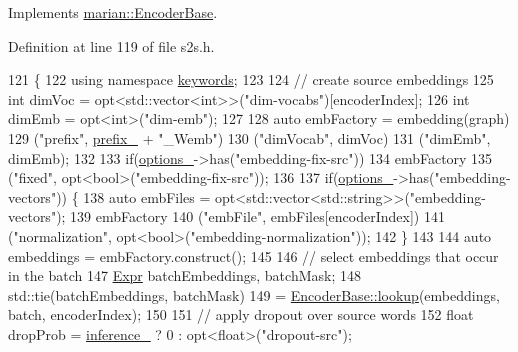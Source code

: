 Implements \hyperlink{classmarian_1_1EncoderBase_a7404d245bf899d6d8023d56407d81272}{marian\+::\+Encoder\+Base}.



Definition at line 119 of file s2s.\+h.


\begin{DoxyCode}
121                                                \{
122     \textcolor{keyword}{using namespace }\hyperlink{namespacekeywords}{keywords};
123 
124     \textcolor{comment}{// create source embeddings}
125     \textcolor{keywordtype}{int} dimVoc = opt<std::vector<int>>(\textcolor{stringliteral}{"dim-vocabs"})[encoderIndex];
126     \textcolor{keywordtype}{int} dimEmb = opt<int>(\textcolor{stringliteral}{"dim-emb"});
127 
128     \textcolor{keyword}{auto} embFactory = embedding(graph)
129                       (\textcolor{stringliteral}{"prefix"}, \hyperlink{classmarian_1_1EncoderBase_abbd764c19ebaae1d6e4ffec0c9930fba}{prefix\_} + \textcolor{stringliteral}{"\_Wemb"})
130                       (\textcolor{stringliteral}{"dimVocab"}, dimVoc)
131                       (\textcolor{stringliteral}{"dimEmb"}, dimEmb);
132 
133     \textcolor{keywordflow}{if}(\hyperlink{classmarian_1_1EncoderBase_a42fa90e65cd49dacccae154bf7873d97}{options\_}->has(\textcolor{stringliteral}{"embedding-fix-src"}))
134       embFactory
135         (\textcolor{stringliteral}{"fixed"}, opt<bool>(\textcolor{stringliteral}{"embedding-fix-src"}));
136 
137     \textcolor{keywordflow}{if}(\hyperlink{classmarian_1_1EncoderBase_a42fa90e65cd49dacccae154bf7873d97}{options\_}->has(\textcolor{stringliteral}{"embedding-vectors"})) \{
138       \textcolor{keyword}{auto} embFiles = opt<std::vector<std::string>>(\textcolor{stringliteral}{"embedding-vectors"});
139       embFactory
140         (\textcolor{stringliteral}{"embFile"}, embFiles[encoderIndex])
141         (\textcolor{stringliteral}{"normalization"}, opt<bool>(\textcolor{stringliteral}{"embedding-normalization"}));
142     \}
143 
144     \textcolor{keyword}{auto} embeddings = embFactory.construct();
145 
146     \textcolor{comment}{// select embeddings that occur in the batch}
147     \hyperlink{namespacemarian_a498d8baf75b754011078b890b39c8e12}{Expr} batchEmbeddings, batchMask;
148     std::tie(batchEmbeddings, batchMask)
149       = \hyperlink{classmarian_1_1EncoderBase_a02e1594dfe8b093081c24f1aea1a35d6}{EncoderBase::lookup}(embeddings, batch, encoderIndex);
150 
151     \textcolor{comment}{// apply dropout over source words}
152     \textcolor{keywordtype}{float} dropProb = \hyperlink{classmarian_1_1EncoderBase_a3543e255f5547f556c6ba30220ee2f2c}{inference\_} ? 0 : opt<float>(\textcolor{stringliteral}{"dropout-src"});

\end{DoxyCode}
